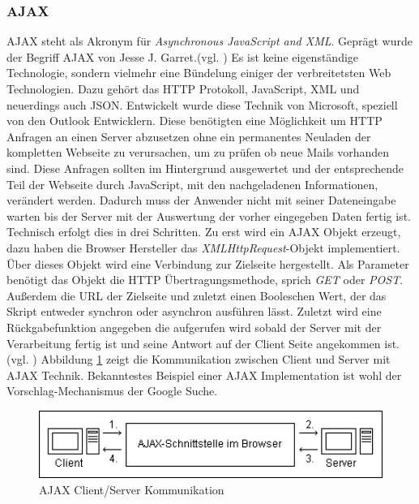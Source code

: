 \subsubsection{AJAX}
AJAX steht als Akronym für \textit{Asynchronous JavaScript and XML}. Geprägt wurde der Begriff AJAX von Jesse J. Garret.(vgl. \cite{JesseJGarret}) Es ist keine eigenständige Technologie, sondern vielmehr eine Bündelung einiger der verbreitetsten Web Technologien. Dazu gehört das HTTP Protokoll, JavaScript, XML und neuerdings auch JSON. Entwickelt wurde diese Technik von Microsoft, speziell von den Outlook Entwicklern. Diese benötigten eine Möglichkeit um HTTP Anfragen an einen Server abzusetzen ohne ein permanentes Neuladen der kompletten Webseite zu verursachen, um zu prüfen ob neue Mails vorhanden sind. Diese Anfragen sollten im Hintergrund ausgewertet und der entsprechende Teil der Webseite durch JavaScript, mit den nachgeladenen Informationen, verändert werden. Dadurch muss der Anwender nicht mit seiner Dateneingabe warten bis der Server mit der Auswertung der vorher eingegeben Daten fertig ist.\\Technisch erfolgt dies in drei Schritten. Zu erst wird ein AJAX Objekt erzeugt, dazu haben die Browser Hersteller das \textit{XMLHttpRequest}-Objekt implementiert. Über dieses Objekt wird eine Verbindung zur Zielseite hergestellt. Als Parameter benötigt das Objekt die HTTP Übertragungsmethode, sprich \textit{GET} oder \textit{POST}. Außerdem die URL der Zielseite und zuletzt einen Booleschen Wert, der das Skript entweder synchron oder asynchron ausführen lässt. Zuletzt wird eine Rückgabefunktion angegeben die aufgerufen wird sobald der Server mit der Verarbeitung fertig ist und seine Antwort auf der Client Seite angekommen ist.(vgl. \cite[S.392ff]{WenzJava2008}) Abbildung \ref{fig:ajax} zeigt die Kommunikation zwischen Client und Server mit AJAX Technik. Bekanntestes Beispiel einer AJAX Implementation ist wohl der Vorschlag-Mechanismus der Google Suche.


\begin{figure}[htb]
  \centering
  \includegraphics[width=1\textwidth]{abb/ajax_uml}
  \caption[AJAX Client/Server Kommunikation]{AJAX Client/Server Kommunikation\footnotemark}
  \label{fig:ajax}
\end{figure}

